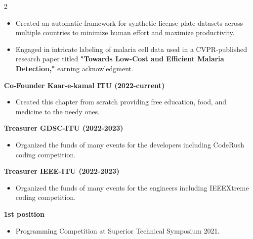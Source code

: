 \documentclass[10pt,a4paper,ragged2e,withhyper]{altacv}
\begin{document}
\begin{paracol}{2}
\divider

\begin{itemize}
\item Created an automatic framework for synthetic license plate datasets across multiple countries to minimize human effort and maximize productivity.
\end{itemize}

\divider

\begin{itemize}
\item Engaged in intricate labeling of malaria cell data used in a CVPR-published research paper titled \textbf{"Towards Low-Cost and Efficient Malaria Detection,"} earning acknowledgment.
\end{itemize}

\switchcolumn
{}
\divider
{}
\divider
{}


    \textbf{Co-Founder Kaar-e-kamal ITU (2022-current)}
        \begin{itemize}
            \item Created this chapter from scratch providing free education, food, and medicine to the needy ones.
        \end{itemize}
    \textbf{Treasurer GDSC-ITU (2022-2023)}
        \begin{itemize}
            \item Organized the funds of many events for the developers including CodeRush coding competition.
        \end{itemize}
    \textbf{Treasurer IEEE-ITU (2022-2023)}
        \begin{itemize}
            \item Organized the funds of many events for the engineers including IEEEXtreme coding competition.
        \end{itemize}
    \textbf{1st position}
        \begin{itemize}
            \item  Programming Competition at Superior Technical
Symposium 2021.
        \end{itemize}


\end{paracol}
\end{document}
